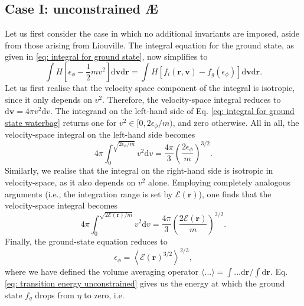 \subsection{Case I: unconstrained \AE{}}
Let us first consider the case in which no additional invariants are imposed, aside from those arising from Liouville. The integral equation for the ground state, as given in \eqref{eq: integral for ground state}, now simplifies to
\begin{equation}
    \int H \left[\epsilon_\phi - \frac{1}{2}mv^2 \right] \mathrm{d} \boldsymbol{v}\mathrm{d} \boldsymbol{r} = \int H[f_i(\boldsymbol{r},\boldsymbol{v}) - f_g(\epsilon_\phi)] \mathrm{d} \boldsymbol{v}\mathrm{d} \boldsymbol{r}.
    \label{eq: integral for ground state waterbag}
\end{equation}
Let us first realise that the velocity space component of the integral is isotropic, since it only depends on $v^2$. Therefore, the velocity-space integral reduces to $\mathrm{d}\boldsymbol{v}=4\pi v^2 \mathrm{d}v$. The integrand on the left-hand side of Eq. \eqref{eq: integral for ground state waterbag} returns one for $v^2 \in [0,2 \epsilon_\phi/m)$, and zero otherwise. All in all, the velocity-space integral on the left-hand side becomes
\begin{equation}
    4 \pi\int_0^{\sqrt{2 \epsilon_\phi/m}} v^2 \mathrm{d}v = \frac{4 \pi}{3} \left( \frac{2 \epsilon_\phi}{m} \right)^{3/2}.
\end{equation}
Similarly, we realise that the integral on the right-hand side is isotropic in velocity-space, as it also depends on $v^2$ alone. Employing completely analogous arguments (i.e., the integration range is set by $\mathcal{E}(\boldsymbol{r})$), one finds that the velocity-space integral becomes
\begin{equation}
    4 \pi \int_0^{\sqrt{2\mathcal{E}(\boldsymbol{r})/m}} v^2 \mathrm{d} v =   \frac{4 \pi}{3} \left( \frac{2 \mathcal{E}(\boldsymbol{r})}{m} \right)^{3/2}.
\end{equation}
Finally, the ground-state equation reduces to
\begin{equation}
    \epsilon_\phi = \left \langle \mathcal{E}(\boldsymbol{r})^{3/2} \right\rangle^{2/3},
    \label{eq: transition energy unconstrained}
\end{equation}
where we have defined the volume averaging operator $\langle ... \rangle = \int ... \mathrm{d} \boldsymbol{r} / \int \mathrm{d} \boldsymbol{r}$. Eq. \eqref{eq: transition energy unconstrained} gives us the energy at which the ground state $f_g$ drops from $\eta$ to zero, i.e.
